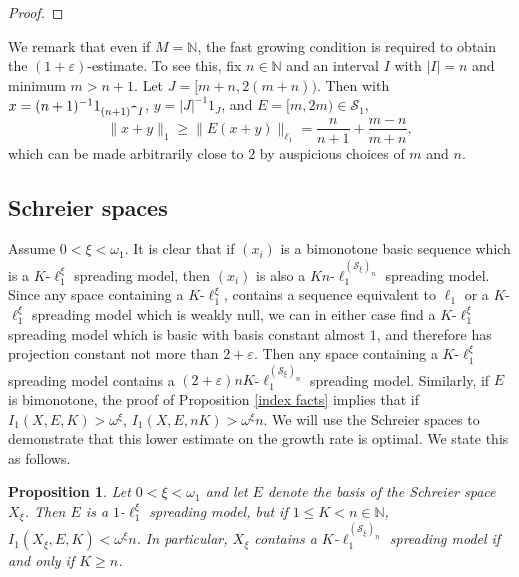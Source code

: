 \documentclass[12pt]{amsart}
\newtheorem{proposition}[theorem]{Proposition}
\theoremstyle{definition}
\newcommand{\nn}{\mathbb{N}}
\newcommand{\sss}{\mathcal{S}}
\begin{document}
\begin{proof}
\end{proof}



We remark that even if $M=\nn$, the fast growing condition is required to obtain the $(1+\varepsilon)$-estimate.  To see this, fix $n\in \nn$ and an interval $I$ with $|I|=n$ and minimum $m>n+1$.  Let $J=[m+n, 2(m+n))$.  Then with $x= (n+1)^{-1}1_{(n+1)\verb!^!I}$, $y=|J|^{-1}1_J$, and $E= [m, 2m)\in \sss_1$, $$\|x+y\|_1 \geqslant \|E(x+y)\|_{\ell_1} = \frac{n}{n+1}+\frac{m-n}{m+n},$$ which can be made arbitrarily close to $2$ by auspicious choices of $m$ and $n$.  



\subsection{Schreier spaces}

Assume $0<\xi<\omega_1$.  It is clear that if $(x_i)$ is a bimonotone basic sequence which is a $K$-$\ell_1^\xi$ spreading model, then $(x_i)$ is also a $Kn$-$\ell_1^{(\sss_\xi)_n}$ spreading model.  Since any space containing a $K$-$\ell_1^\xi$, contains a sequence equivalent to $\ell_1$ or a $K$-$\ell_1^\xi$ spreading model which is weakly null, we can in either case find a $K$-$\ell_1^\xi$ spreading model which is basic with basis constant almost $1$, and therefore has projection constant not more than $2+\varepsilon$.  Then any space containing a $K$-$\ell_1^\xi$ spreading model contains a $(2+\varepsilon)nK$-$\ell_1^{(\sss_\xi)_n}$ spreading model. Similarly, if $E$ is bimonotone, the proof of Proposition \ref{index facts} implies that if $I_1(X, E, K)>\omega^\xi$, $I_1(X, E, nK)>\omega^\xi n$.  We will use the Schreier spaces to demonstrate that this lower estimate on the growth rate is optimal.  We state this as follows.  

\begin{proposition} Let $0<\xi<\omega_1$ and let $E$ denote the basis of the Schreier space $X_\xi$.  Then $E$ is a $1$-$\ell_1^\xi$ spreading model, but if $1\leqslant K<n\in \nn$, $I_1(X_\xi, E, K)<\omega^\xi n$.  In particular, $X_\xi$ contains a $K$-$\ell_1^{(\sss_\xi)_n}$ spreading model if and only if $K\geqslant n$.  

\label{Schreier sharp}

\end{proposition}
\end{document}

